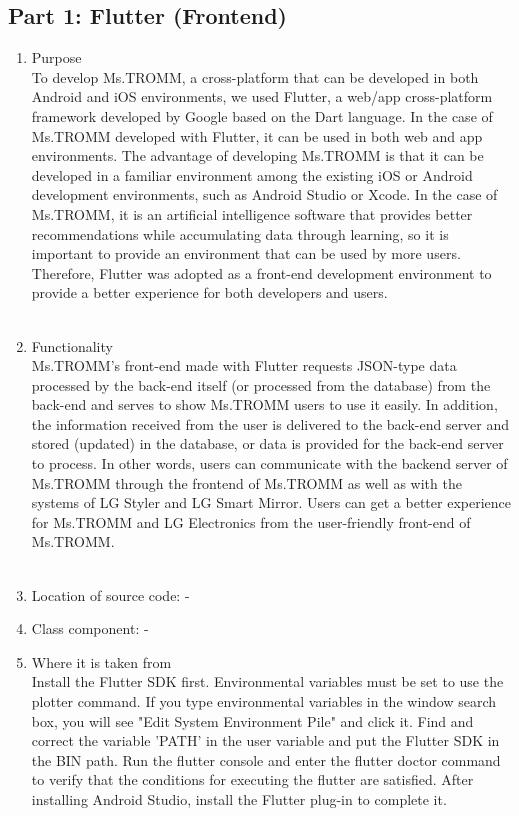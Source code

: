 \documentclass[conference]{IEEEtran}
\begin{document}
\subsection{Part 1: Flutter (Frontend)}
\begin{enumerate}
    \item Purpose\\
    To develop Ms.TROMM, a cross-platform that can be developed in both Android and iOS environments, we used Flutter, a web/app cross-platform framework developed by Google based on the Dart language. In the case of Ms.TROMM developed with Flutter, it can be used in both web and app environments. The advantage of developing Ms.TROMM is that it can be developed in a familiar environment among the existing iOS or Android development environments, such as Android Studio or Xcode. In the case of Ms.TROMM, it is an artificial intelligence software that provides better recommendations while accumulating data through learning, so it is important to provide an environment that can be used by more users. Therefore, Flutter was adopted as a front-end development environment to provide a better experience for both developers and users. \\ \\
    \item Functionality\\
    Ms.TROMM's front-end made with Flutter requests JSON-type data processed by the back-end itself (or processed from the database) from the back-end and serves to show Ms.TROMM users to use it easily. In addition, the information received from the user is delivered to the back-end server and stored (updated) in the database, or data is provided for the back-end server to process. In other words, users can communicate with the backend server of Ms.TROMM through the frontend of Ms.TROMM as well as with the systems of LG Styler and LG Smart Mirror. Users can get a better experience for Ms.TROMM and LG Electronics from the user-friendly front-end of Ms.TROMM. \\ \\
    \item Location of source code: - \\
    \item Class component: - \\
    \item Where it is taken from\\
    Install the Flutter SDK first. Environmental variables must be set to use the plotter command. If you type environmental variables in the window search box, you will see "Edit System Environment Pile" and click it. Find and correct the variable 'PATH' in the user variable and put the Flutter SDK in the BIN path. Run the flutter console and enter the flutter doctor command to verify that the conditions for executing the flutter are satisfied. After installing Android Studio, install the Flutter plug-in to complete it.\\ \\

\end{enumerate}
\end{document}
